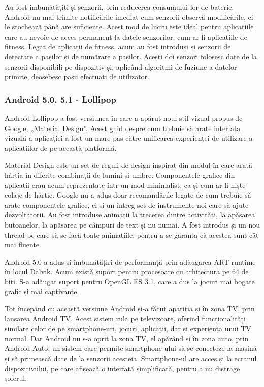\documentclass[12pt,a4paper]{article}
\begin{document}
	Au fost imbunătățiți și senzorii, prin reducerea consumului lor de baterie. Android nu  mai trimite notificările imediat cum senzorii observă modificările, ci le stochează până are suficiente.  Acest mod de lucru este ideal pentru aplicațiile care au nevoie de acces permanent la datele senzorilor, cum ar fi aplicațiile de fitness. Legat de aplicații de fitness, acum au fost introduși și senzorii de detectare a pașilor și de numărare a pașilor. Acești doi senzori folosesc date de la senzorii disponibili pe dispozitiv și, aplicând algoritmi de fuziune a datelor primite, deosebesc pașii efectuați de utilizator.


\subsubsection{Android 5.0, 5.1 - Lollipop}
Android Lollipop a fost versiunea în care a apărut noul stil vizual propus de Google, „Material Design”. Acest ghid despre cum trebuie să arate interfața vizuală a aplicației a fost un mare pas către unificarea experienței de utilizare a aplicațiilor de pe această platformă.
	
	Material Design este un set de reguli de design inspirat din modul în care arată hârtia în diferite combinații de lumini și umbre.
Componentele grafice din aplicații erau acum reprezentate într-un mod minimalist, ca și cum ar fi niște colaje de hârtie. Google nu a adus doar recomandările legate de cum trebuie să arate componentele grafice, ci și un întreg set de instrumente noi care să ajute dezvoltatorii. Au fost introduse animații la trecerea dintre activități, la apăsarea butoanelor, la apăsarea pe câmpuri de text și nu numai. A fost introdus și un nou thread pe care să se facă toate animațiile, pentru a se garanta că acestea sunt cât mai fluente.
	
	Android 5.0 a adus și îmbunătățiri de performanță prin adăugarea ART runtime în locul Dalvik. Acum există suport pentru procesoare cu arhitectura pe 64 de biți. S-a adăugat suport pentru OpenGL ES 3.1, care a dus la jocuri mai bogate grafic și mai captivante.
	
	Tot începând cu această versiune Android și-a făcut apariția și în zona TV, prin lansarea Android TV. Acest sistem rula pe televizoare, oferind funcționalități similare celor de pe smartphone-uri, jocuri, aplicații, dar și experiența unui TV normal. Dar Android nu s-a oprit la zona TV, el apărând și în zona auto, prin Android Auto, un sistem care permite smartphone-ului să se conecteze la mașină și să primească date de la senzorii acesteia. Smartphone-ul are acces și la ecranul dispozitivului, pe care afișează o interfață simplificată, pentru a nu distrage șoferul.
\end{document}
